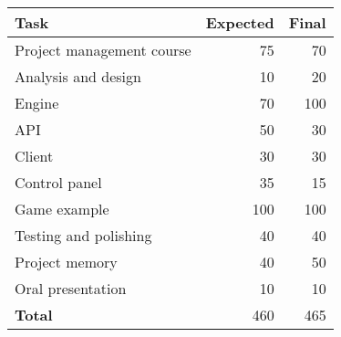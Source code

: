 \begin{figure}[H]
\begin{center}
\begin{tabular}{l r r}
\textbf{Task} & \textbf{Expected} & \textbf{Final}\\
\hline
Project management course & 75 & 70\\
Analysis and design & 10 & 20\\
Engine & 70 & 100\\
API & 50 & 30\\
Client & 30 & 30\\
Control panel & 35 & 15\\
Game example & 100 & 100\\
Testing and polishing & 40 & 40\\
Project memory & 40 & 50\\
Oral presentation & 10 & 10\\
\hline
\hline
\textbf{Total} & 460 & 465\\
\end{tabular}
\end{center}
\end{figure}
